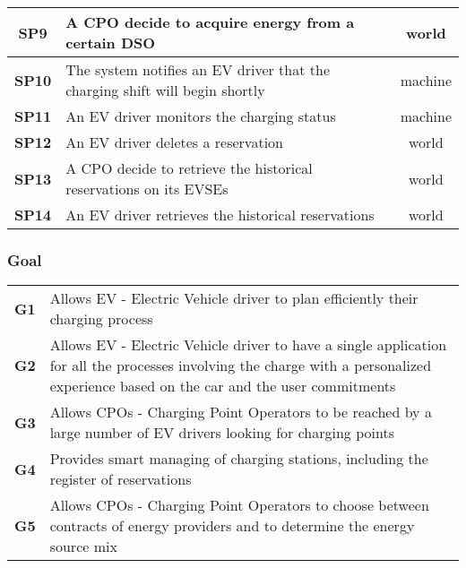 \begin{table}[H]
\begin{tabularx}{\textwidth}{c|X|c}
        \textbf{SP9}  & A CPO decide to acquire energy from a certain DSO                                                                                                                     & world         \\ \midrule
        \textbf{SP10} & The system notifies an EV driver that the charging shift will begin shortly                                                                                           & machine       \\ \midrule
        \textbf{SP11} & An EV driver monitors the charging status                                                                                                                             & machine       \\ \midrule
        \textbf{SP12} & An EV driver deletes a reservation                                                                                                                                    & world         \\ \midrule
        \textbf{SP13} & A CPO decide to retrieve the historical reservations on its EVSEs                                                                                                     & world         \\ \midrule
        \textbf{SP14} & An EV driver retrieves the historical reservations                                                                                                                    & world         \\ \bottomrule
    \end{tabularx}
\end{table}

\subsubsection{Goal}
\begin{table}[H]
    \begin{tabularx}{\textwidth}{cX}
        \toprule
        \textbf{G1} & Allows EV - Electric Vehicle driver to plan efficiently their charging process                                   \\
        \textbf{G2} & Allows EV - Electric Vehicle driver to have a single application for all the processes involving
        the charge with a personalized experience based on the car and the user commitments                                            \\
        \textbf{G3} & Allows CPOs - Charging Point Operators to be reached by a large number of EV drivers looking for charging points \\
        \textbf{G4} & Provides smart managing of charging stations, including the register of reservations                             \\
        \textbf{G5} & Allows CPOs - Charging Point Operators to choose between contracts of energy providers and
        to determine the energy source mix                                                                                             \\ \bottomrule
    \end{tabularx}
\end{table}

